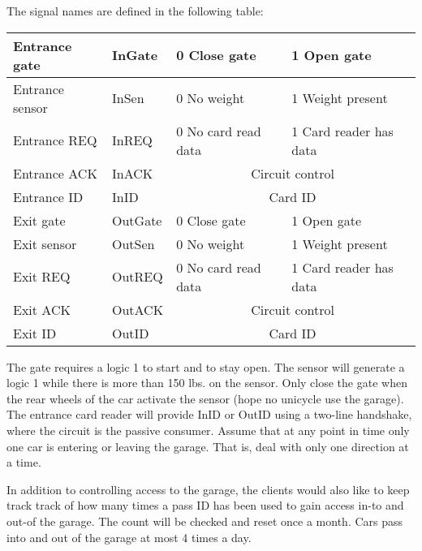 \begin{enumerate}
        The signal names are defined in the following table:

        \begin{tabular}{|l|l||l|l|} \hline
            Entrance gate   & InGate  & 0 Close gate                         & 1 Open gate            \\ \hline
            Entrance sensor & InSen   & 0 No weight                          & 1 Weight present       \\ \hline
            Entrance REQ    & InREQ   & 0 No card read data                  & 1 Card reader has data \\ \hline
            Entrance ACK    & InACK   & \multicolumn{2}{c|}{Circuit control}                          \\ \hline
            Entrance ID     & InID    & \multicolumn{2}{c|}{Card ID}                                  \\ \hline
            Exit gate       & OutGate & 0 Close gate                         & 1 Open gate            \\ \hline
            Exit sensor     & OutSen  & 0 No weight                          & 1 Weight present       \\ \hline
            Exit REQ        & OutREQ  & 0 No card read data                  & 1 Card reader has data \\ \hline
            Exit ACK        & OutACK  & \multicolumn{2}{c|}{Circuit control}                          \\ \hline
            Exit ID         & OutID   & \multicolumn{2}{c|}{Card ID}                                  \\ \hline
        \end{tabular}

        The gate requires a logic 1 to start and to stay open. The sensor will
        generate a logic 1 while there is more than 150 lbs. on the sensor.  Only
        close the gate when the rear wheels of the car activate the
        sensor (hope no unicycle use the garage).  The entrance card reader
        will provide InID or OutID using a
        two-line handshake, where the circuit is the passive consumer.
        Assume that at any point in time only one car is
        entering or leaving the garage.  That is, deal with only
        one direction at a time.

        In addition to controlling access to the garage, the clients would also
        like to keep track track of how many times a pass ID has been used to
        gain access in-to and out-of the garage.  The count will be checked and
        reset once a month.  Cars pass into and out of the garage at most 4
        times a day.


\end{enumerate}
